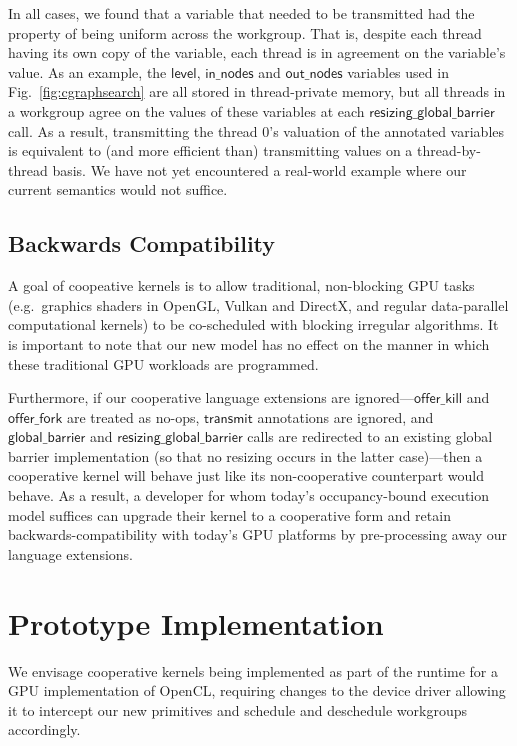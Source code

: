 \documentclass[numbers,nocopyrightspace,10pt]{sigplanconf}
\newcommand{\myfig}{Fig.~}
\newcommand{\transmit}{\mathsf{transmit}}
\newcommand{\offerfork}{\mathsf{offer\_fork}}
\newcommand{\offerkill}{\mathsf{offer\_kill}}
\newcommand{\globalbarrier}{\mathsf{global\_barrier}}
\newcommand{\resizingglobalbarrier}{\mathsf{resizing\_global\_barrier}}
\newcommand{\keyword}[1]{\mathsf{#1}}
\begin{document}
In all cases, we found that a variable that needed to be transmitted
had the property of being uniform across the workgroup.  That is,
despite each thread having its own copy of the variable, each thread
is in agreement on the variable's value.  As an example, the
$\keyword{level}$, $\keyword{in\_nodes}$ and $\keyword{out\_nodes}$
variables used in \myfig\ref{fig:cgraphsearch} are all stored in thread-private
memory, but all threads in a workgroup agree on the values of these
variables at each $\resizingglobalbarrier$ call.  As a result,
transmitting the thread 0's valuation of the annotated variables is
equivalent to (and more efficient than) transmitting values on a
thread-by-thread basis.  We have not yet encountered a real-world
example where our current semantics would not suffice.



\subsection{Backwards Compatibility}\label{sec:backwardscompatibility}

A goal of coopeative kernels is to allow traditional, non-blocking GPU
tasks (e.g.\ graphics shaders in OpenGL, Vulkan and DirectX, and regular data-parallel computational kernels)
to be co-scheduled with blocking irregular algorithms.  It is
important to note that our new model has no effect on the manner in
which these traditional GPU workloads are programmed.

Furthermore, if our cooperative language extensions are
ignored---$\offerkill$ and $\offerfork$ are treated as no-ops,
$\transmit$ annotations are ignored, and $\globalbarrier$ and
$\resizingglobalbarrier$ calls are redirected to an existing global
barrier implementation (so that no resizing occurs in the latter
case)---then a cooperative kernel will behave just like its
non-cooperative counterpart would behave.  As a result, a developer
for whom today's occupancy-bound execution model suffices can upgrade
their kernel to a cooperative form and retain backwards-compatibility
with today's GPU platforms by pre-processing away our language
extensions.


\section{Prototype Implementation}\label{sec:implementation}

We envisage cooperative kernels being implemented as part of the
runtime for a GPU implementation of OpenCL, requiring changes to the
device driver allowing it to intercept our new primitives and schedule
and deschedule workgroups accordingly.
\end{document}
